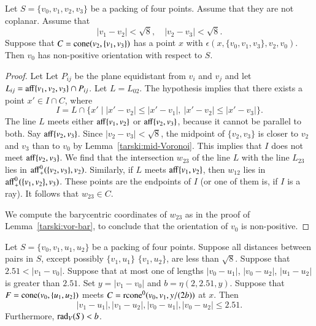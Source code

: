 \begin{tarskidata}
\begin{tarski}
\begin{lemma}
Let $S=\{v_0,v_1,v_2,v_3\}$ be a packing of four points.
Assume that they are not coplanar.
Assume that 
$$
|v_1-v_2|<\sqrt8,\quad  |v_2-v_3|<\sqrt8.
$$
Suppose that
$C={\operatorname{cone}}(v_2,\{v_1,v_3\})$ has a point $x$ with 
  $\epsilon(x,\{v_0,v_1,v_3\},v_2,v_0)$.    
Then $v_0$ has non-positive orientation with respect to $S$.
\end{lemma}



\begin{proof} 
Let Let $P_{ij}$ be the plane equidistant from $v_i$ and
$v_j$ and let $L_{ij} = {\operatorname{aff}}\{v_1,v_2,v_3\}\cap P_{ij}$.
Let $L=L_{02}$.
The hypothesis implies that there exists a point 
$x'\in I \cap C$, where
   $$I= L\cap \{x'\mid |x'-v_2|\le|x'-v_1|,\ |x'-v_2|\le |x'-v_3|\}.$$  
The line $L$ meets either ${\operatorname{aff}}\{v_1,v_2\}$ or ${\operatorname{aff}}\{v_2,v_3\}$,
because it cannot be parallel to both.  Say ${\operatorname{aff}}\{v_2,v_3\}$.
Since $|v_2-v_3|<\sqrt8$, the midpoint of $\{v_2,v_3\}$ is closer
to $v_2$ and $v_3$ than to $v_0$ by Lemma~\ref{tarski:mid-Voronoi}.
This implies that $I$ does not meet ${\operatorname{aff}}\{v_2,v_3\}$.
We find that the intersection $w_{23}$ of the line $L$ with
the line $L_{23}$ lies in ${\operatorname{aff}}_+^0(\{v_2,v_3\},v_2)$.  Similarly,
if $L$ meets ${\operatorname{aff}}\{v_1,v_2\}$, then $w_{12}$ lies in
${\operatorname{aff}}_+^0(\{v_1,v_2\},v_3)$.  These points are the endpoints of 
$I$ (or one of them is, if $I$ is a ray).  It follows that $w_{23}\in C$.

We compute the barycentric coordinates of $w_{23}$ as in the proof
of Lemma~\ref{tarski:vor-bar}, to conclude that the orientation
of $v_0$ is non-positive.
\end{proof}
\end{tarski}





\begin{tarski}

\begin{lemma}
 Let $S=\{v_0,v_1,u_1,u_2\}$ be a packing of four points.
Suppose all distances between pairs in $S$, except possibly $\{v_1,u_1\}$
$\{v_1,u_2\}$, are
less than $\sqrt8$. Suppose that $2.51 < |v_1-v_0|$.
Suppose that at most one of lengths $|v_0-u_1|$,
$|v_0-u_2|$, $|u_1-u_2|$ is greater than $2.51$.
%
Set $y=|v_1-v_0|$ and $b=\eta(2,2.51,y)$.
Suppose that $F={\operatorname{cone}}(v_0,\{u_1,u_2\})$ meets
$C={\operatorname{rcone}}^0(v_0,v_1,y/(2b))$ at $x$.
Then 
  $$
  |v_1-u_1|,|v_1-u_2|,|v_0-u_1|,|v_0-u_2|\le 2.51.
  $$
Furthermore, $\operatorname{rad}_V(S) < b$. 
\end{lemma}


\end{tarski}
\end{tarskidata}
